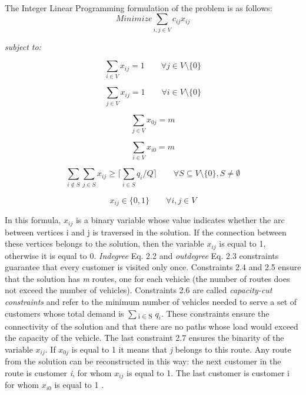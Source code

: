 \documentclass[a4paper,twoside,12pt]{book}
\begin{document}
\paragraph{}
The Integer Linear Programming formulation of the problem is as follows:\cite{bib:book:TothAndVigo}
\begin{equation}
Minimize \sum_{i,j \in V} c_{ij}x_{ij}
\end{equation}

\textit{subject to:}

\begin{equation}
\sum_{i \in V}x_{ij} = 1 \qquad \forall j \in V \setminus \lbrace 0 \rbrace
\end{equation}

\begin{equation}
\sum_{j \in V}x_{ij} = 1 \qquad \forall i \in V \setminus \lbrace 0 \rbrace
\end{equation}

\begin{equation}
\sum_{j \in V}x_{0j} = m 
\end{equation}

\begin{equation}
\sum_{i \in V}x_{i0} = m 
\end{equation}

\begin{equation}
\sum_{i \not\in S} \sum_{j \in S}x_{ij} \geq \lceil \sum_{i \in S} q_{i} / Q \rceil \qquad \forall S \subseteq V \setminus \lbrace 0 \rbrace , S \neq \emptyset
\end{equation}

\begin{equation}
x_{ij} \in \lbrace 0,1 \rbrace \qquad \forall i,j \in V
\end{equation}

In this formula, $x_{ij}$  is a binary variable whose value indicates whether the arc between vertices i and j is traversed in the solution.  
If the connection between these vertices belongs to the solution, then the variable $x_{ij}$ is equal to 1, otherwise it is equal to 0. \textit{Indegree} Eq. 2.2 and \textit{outdegree} Eq. 2.3 constraints guarantee that every customer is visited only once. Constraints 2.4 and 2.5 ensure that the solution has \textit{m} routes, one for each vehicle (the number of routes does not exceed the number of vehicles).
Constraints 2.6 are called \textit{capacity-cut constraints} and refer to the minimum number of vehicles needed to serve a set of customers whose total demand is $\sum$\textsubscript{i$\in$S} $q_{i}$. These constraints ensure the connectivity of the solution and that there are no paths whose load would exceed the capacity of the vehicle. The last constraint 2.7 ensures the binarity of the variable $x_{ij}$. If $x_{0j}$ is equal to 1 it means that \textit{j} belongs to this route. Any route from the solution can be reconstructed in this way: the next customer in the route is customer \textit{i}, for whom $x_{ij}$ is equal to 1. The last customer is customer i for whom $x_{i0}$ is equal to 1 \cite{bib:book:TothAndVigo}.
\end{document}
